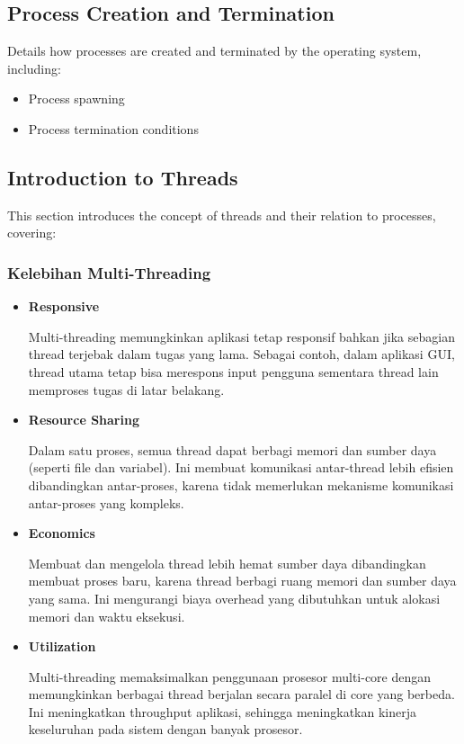 \documentclass[12pt]{article}
\begin{document}
\subsection{Process Creation and Termination}
Details how processes are created and terminated by the operating system, including:
\begin{itemize}
    \item Process spawning
    \item Process termination conditions
\end{itemize}

\subsection{Introduction to Threads}
This section introduces the concept of threads and their relation to processes, covering:
\subsubsection{Kelebihan Multi-Threading}
\begin{itemize}
    \item\textbf{Responsive} 
    \par \hspace{2em} Multi-threading memungkinkan aplikasi tetap responsif bahkan jika sebagian thread terjebak dalam tugas yang lama. Sebagai contoh, dalam aplikasi GUI, thread utama tetap bisa merespons input pengguna sementara thread lain memproses tugas di latar belakang.
    \item\textbf{Resource Sharing}
    \par \hspace{2em} Dalam satu proses, semua thread dapat berbagi memori dan sumber daya (seperti file dan variabel). Ini membuat komunikasi antar-thread lebih efisien dibandingkan antar-proses, karena tidak memerlukan mekanisme komunikasi antar-proses yang kompleks.
    \item\textbf{Economics}
    \par \hspace{2em} Membuat dan mengelola thread lebih hemat sumber daya dibandingkan membuat proses baru, karena thread berbagi ruang memori dan sumber daya yang sama. Ini mengurangi biaya overhead yang dibutuhkan untuk alokasi memori dan waktu eksekusi.
    \item\textbf{Utilization}
    \par \hspace{2em} Multi-threading memaksimalkan penggunaan prosesor multi-core dengan memungkinkan berbagai thread berjalan secara paralel di core yang berbeda. Ini meningkatkan throughput aplikasi, sehingga meningkatkan kinerja keseluruhan pada sistem dengan banyak prosesor.
\end{itemize}
\end{document}
